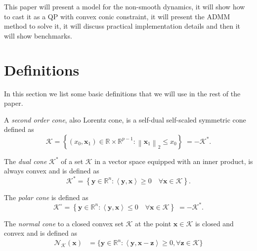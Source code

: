 \documentclass[AMA,STIX1COL]{WileyNJD-v2}
\newcommand{\vect}[1]{\bm{#1}}
\newcommand{\norm}[1]{\left\lVert#1\right\rVert}
\begin{document}
This paper will present a model for the non-smooth dynamics, it will show how to cast it as a QP with convex conic constraint, it will present the ADMM method to solve it, it will discuss practical implementation details and then it will show benchmarks.




\section{Definitions}

In this section we list some basic definitions that we will use in the rest of the paper. 

\begin{definition}
A \textit{second order cone}, also Lorentz cone, is a self-dual self-scaled symmetric cone defined as
\begin{equation}
\label{eq:lorentzcone}
\mathcal{K} 
= \left \{ (x_0,\vect{x}_1) \in \mathbb{R} \times \mathbb{R}^{p-1}: \norm{\vect{x}_1}_2 \leq x_0  \right \} 
\; =   -\mathcal{K}^*.
\end{equation}
\end{definition}

\begin{definition}
The \textit{dual cone} $\mathcal{K}^*$ of a set $\mathcal{K}$ in a vector space equipped with an inner product, is always convex and is defined as
\begin{equation}
\label{eq:dualcone}
\mathcal{K}^* 
= \left \{ \vect{y} \in \mathbb{R}^n: \left\langle \vect{y}, \vect{x} \right\rangle \geq 0 \quad \forall \vect{x} \in \mathcal{K}  \right \}.
\end{equation}
\end{definition}

\begin{definition}
The \textit{polar cone} is defined as
\begin{equation}
\label{eq:polarcone}
\mathcal{K}^\circ 
= \left \{ \vect{y} \in \mathbb{R}^n: \left\langle \vect{y}, \vect{x} \right\rangle \leq 0 \quad \forall \vect{x} \in \mathcal{K}  \right \} 
\; =   -\mathcal{K}^*.
\end{equation}
\end{definition}

\begin{definition}
The \textit{normal cone} to a closed convex set $\mathcal{K}$ at the point $\vect{x}\in\mathcal{K}$ is
closed and convex and is defined as
\begin{align}
\label{eq:normalcone}
\mathcal{N}_{\mathcal{K}}(\vect{x}) 
&= \{ \vect{y} \in \mathbb{R}^n : \left\langle \vect{y}, \vect{x} - \vect{z} \right\rangle \geq 0, \forall \vect{z} \in \mathcal{K} \} 
\end{align}
\end{definition}
\end{document}

